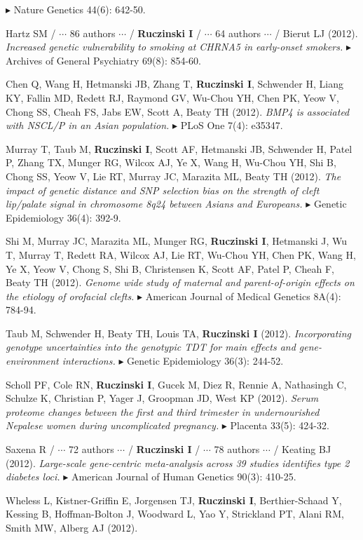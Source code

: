 \documentclass[10pt]{article}
\newcommand{\mine}{
  \addtocounter{enumi}{1}
\item[\fcolorbox{white}{grey}{\color{white} \tiny \arabic{enumi}}]
}
\newcommand{\dg}[1]{{\color{black} $\blacktriangleright$ {#1}}}
\begin{document}
\dg{Nature Genetics 44(6): 642-50.}
\item 
Hartz SM / $\cdots$ 86 authors $\cdots$ / {\bf Ruczinski I} / $\cdots$ 64 authors $\cdots$ / Bierut LJ (2012).
{\it Increased genetic vulnerability to smoking at CHRNA5 in early-onset smokers.}
\dg{Archives of General Psychiatry 69(8): 854-60.}
\item 
Chen Q, Wang H, Hetmanski JB, Zhang T, {\bf Ruczinski I}, Schwender H, Liang KY, Fallin MD, Redett RJ, Raymond GV, Wu-Chou YH, Chen PK, Yeow V, Chong SS, Cheah FS, Jabs EW, Scott A, Beaty TH (2012).
{\it BMP4 is associated with NSCL/P in an Asian population.} 
\dg{PLoS One 7(4): e35347.}
\item
Murray T, Taub M, {\bf Ruczinski I}, Scott AF, Hetmanski JB, Schwender H, Patel P, Zhang TX, Munger RG, Wilcox AJ, Ye X, Wang H, Wu-Chou YH, Shi B, Chong SS, Yeow V, Lie RT, Murray JC, Marazita ML, Beaty TH (2012).
{\it The impact of genetic distance and SNP selection bias on the strength of cleft lip/palate signal in chromosome 8q24 between Asians and Europeans.}
\dg{Genetic Epidemiology 36(4): 392-9.}
\item 
Shi M, Murray JC, Marazita ML, Munger RG, {\bf Ruczinski I}, Hetmanski J, Wu T, Murray T, Redett RA, Wilcox AJ, Lie RT, Wu-Chou YH, Chen PK, Wang H, Ye X, Yeow V, Chong S, Shi B, Christensen K, Scott AF, Patel P, Cheah F, Beaty TH (2012).
{\it Genome wide study of maternal and parent-of-origin effects on the etiology of orofacial clefts.}
\dg{American Journal of Medical Genetics} 8A(4): 784-94.
\mine
Taub M, Schwender H, Beaty TH, Louis TA, {\bf Ruczinski I} (2012).
{\it Incorporating genotype uncertainties into the genotypic TDT for main effects and gene-environment interactions.}
\dg{Genetic Epidemiology 36(3): 244-52.}
\item  
Scholl PF, Cole RN, {\bf Ruczinski I}, Gucek M, Diez R, Rennie A, Nathasingh C, Schulze K, Christian P, Yager J, Groopman JD, West KP (2012).
{\it Serum proteome changes between the first and third trimester in undernourished Nepalese women during uncomplicated pregnancy.}
\dg{Placenta} 33(5): 424-32.
\item
Saxena R / $\cdots$ 72 authors $\cdots$ / {\bf Ruczinski I} / $\cdots$ 78 authors $\cdots$ / Keating BJ (2012).
{\it Large-scale gene-centric meta-analysis across 39 studies identifies type 2 diabetes loci.}
\dg{American Journal of Human Genetics} 90(3): 410-25. 
\item 
Wheless L, Kistner-Griffin E, Jorgensen TJ, {\bf Ruczinski I}, Berthier-Schaad Y, Kessing B, Hoffman-Bolton J, Woodward L, Yao Y, Strickland PT, Alani RM, Smith MW, Alberg AJ (2012).
\end{document}
